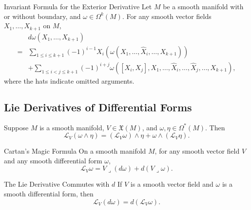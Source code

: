 \documentclass[../main.tex]{subfiles}
\begin{document}
\begin{proposition}{Invariant Formula for the Exterior Derivative}{}
Let $M$ be a smooth manifold with or without boundary, and $\omega \in \Omega^k(M)$. For any smooth vector fields $X_1, \dots, X_{k+1}$ on $M$,
\begin{equation}
\begin{aligned}
&d\omega(X_1, \dots, X_{k+1})  \\
= & \sum_{1 \le i \le k+1} (-1)^{i-1} X_i \left(\omega(X_1, \dots, \hat{X}_i, \dots, X_{k+1})\right) \\
& + \sum_{1 \le i < j \le k+1} (-1)^{i+j} \omega \left([X_i, X_j], X_1, \dots, \hat{X}_i, \dots, \hat{X}_j, \dots, X_{k+1}\right),
\end{aligned}
\end{equation}
where the hats indicate omitted arguments.
\end{proposition}


\subsection{Lie Derivatives of Differential Forms}
\begin{proposition}{}{}
Suppose $M$ is a smooth manifold, $V \in \mathfrak{X}(M)$, and $\omega, \eta \in \Omega^*(M)$. Then
\[
\mathscr{L}_V(\omega \wedge \eta) = (\mathscr{L}_V \omega) \wedge \eta + \omega \wedge (\mathscr{L}_V \eta).
\]
\end{proposition}
\begin{theorem}{Cartan's Magic Formula}{}
On a smooth manifold $M$, for any smooth vector field $V$ and any smooth differential form $\omega$,
\begin{equation}
\mathscr{L}_V \omega = V  \lrcorner (d\omega) + d(V  \lrcorner \omega).
\end{equation}
\end{theorem}
\begin{corollary}{The Lie Derivative Commutes with $d$}{}
If $V$ is a smooth vector field and $\omega$ is a smooth differential form, then
\[
\mathscr{L}_V(d\omega) = d(\mathscr{L}_V\omega).
\]
\end{corollary}
\end{document}
